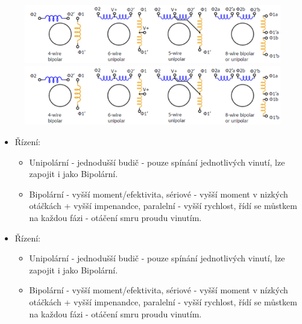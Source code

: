 \begin{figure}[h]
  \begin{center}
    \includegraphics[scale = 1]{img/picture8.png}
  \end{center}
    \begin{center}
        \includegraphics[scale = 1]{img/picture8.png}
    \end{center}
\end{figure}

\begin{itemize}
  \item Řízení: \begin{itemize}
    \item Unipolární - jednodušší budič - pouze spínání jednotlivých vinutí, lze zapojit i jako Bipolární.
    \item Bipolární - vyšší moment/efektivita, sériové - vyšší moment v nizkých otáčkách + vyšší impenandce, paralelní - vyšší rychlost, řídí se můstkem na každou fázi - otáčení smru proudu vinutím.
  \end{itemize}
    \item Řízení: \begin{itemize}
              \item Unipolární - jednodušší budič - pouze spínání jednotlivých vinutí, lze zapojit i jako Bipolární.
              \item Bipolární - vyšší moment/efektivita, sériové - vyšší moment v nízkých otáčkách + vyšší impenandce, paralelní - vyšší rychlost, řídí se můstkem na každou fázi - otáčení smru proudu vinutím.
          \end{itemize}
\end{itemize}

